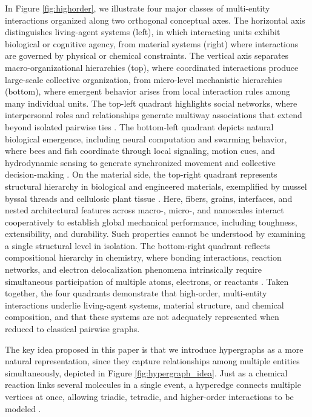 \documentclass{article}
\begin{document}
In Figure \ref{fig:highorder}, we illustrate four major classes of multi-entity interactions organized along two orthogonal conceptual axes. The horizontal axis distinguishes living-agent systems (left), in which interacting units exhibit biological or cognitive agency, from material systems (right) where interactions are governed by physical or chemical constraints. The vertical axis separates macro-organizational hierarchies (top), where coordinated interactions produce large-scale collective organization, from micro-level mechanistic hierarchies (bottom), where emergent behavior arises from local interaction rules among many individual units. The top-left quadrant highlights social networks, where interpersonal roles and relationships generate multiway associations that extend beyond isolated pairwise ties \cite{bassett_network_2017, barabasi_network_2016, coulson_strength_2010, wasserman_social_1994}. The bottom-left quadrant depicts natural biological emergence, including neural computation \cite{sporns_networks_2011} and swarming behavior, where bees and fish coordinate through local signaling, motion cues, and hydrodynamic sensing to generate synchronized movement and collective decision-making \cite{seeley_wisdom_2009, camazine_self-organization_2003}. On the material side, the top-right quadrant represents structural hierarchy in biological and engineered materials, exemplified by mussel byssal threads \cite{ehrlich_marine_2019} and cellulosic plant tissue \cite{eichhorn_review_2010}. Here, fibers, grains, interfaces, and nested architectural features across macro-, micro-, and nanoscales interact cooperatively to establish global mechanical performance, including toughness, extensibility, and durability. Such properties cannot be understood by examining a single structural level in isolation. The bottom-right quadrant reflects compositional hierarchy in chemistry, where bonding interactions, reaction networks, and electron delocalization phenomena \cite{carey_advanced_2007} intrinsically require simultaneous participation of multiple atoms, electrons, or reactants \cite{atkins_molecular_2011}. Taken together, the four quadrants demonstrate that high-order, multi-entity interactions underlie living-agent systems, material structure, and chemical composition, and that these systems are not adequately represented when reduced to classical pairwise graphs.

The key idea proposed in this paper is that we introduce hypergraphs as a more natural representation, since they capture relationships among multiple entities simultaneously, depicted in Figure \ref{fig:hypergraph_idea}. Just as a chemical reaction links several molecules in a single event, a hyperedge connects multiple vertices at once, allowing triadic, tetradic, and higher-order interactions to be modeled \cite{chang_hypergraph_2024, konstantinova_application_2001}. 
\end{document}
